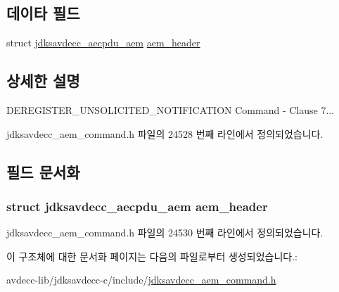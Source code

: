 \subsection*{데이타 필드}
\begin{DoxyCompactItemize}
\item 
struct \hyperlink{structjdksavdecc__aecpdu__aem}{jdksavdecc\+\_\+aecpdu\+\_\+aem} \hyperlink{structjdksavdecc__aem__command__deregister__unsolicited__notification_ae1e77ccb75ff5021ad923221eab38294}{aem\+\_\+header}
\end{DoxyCompactItemize}


\subsection{상세한 설명}
D\+E\+R\+E\+G\+I\+S\+T\+E\+R\+\_\+\+U\+N\+S\+O\+L\+I\+C\+I\+T\+E\+D\+\_\+\+N\+O\+T\+I\+F\+I\+C\+A\+T\+I\+ON Command -\/ Clause 7... 

jdksavdecc\+\_\+aem\+\_\+command.\+h 파일의 24528 번째 라인에서 정의되었습니다.



\subsection{필드 문서화}
\subsubsection[{\texorpdfstring{aem\+\_\+header}{aem_header}}]{\setlength{\rightskip}{0pt plus 5cm}struct {\bf jdksavdecc\+\_\+aecpdu\+\_\+aem} aem\+\_\+header}\hypertarget{structjdksavdecc__aem__command__deregister__unsolicited__notification_ae1e77ccb75ff5021ad923221eab38294}{}\label{structjdksavdecc__aem__command__deregister__unsolicited__notification_ae1e77ccb75ff5021ad923221eab38294}


jdksavdecc\+\_\+aem\+\_\+command.\+h 파일의 24530 번째 라인에서 정의되었습니다.



이 구조체에 대한 문서화 페이지는 다음의 파일로부터 생성되었습니다.\+:\begin{DoxyCompactItemize}
\item 
avdecc-\/lib/jdksavdecc-\/c/include/\hyperlink{jdksavdecc__aem__command_8h}{jdksavdecc\+\_\+aem\+\_\+command.\+h}\end{DoxyCompactItemize}
